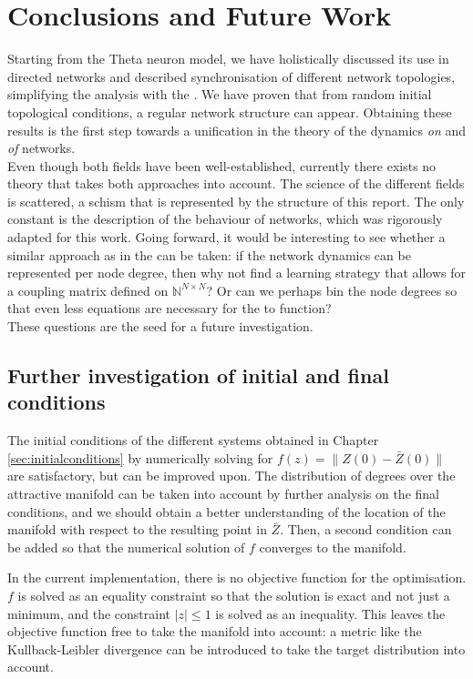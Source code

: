 \newpage
\section{Conclusions and Future Work} \label{sec:ConclusionAndDiscussion}
Starting from the Theta neuron model, we have holistically discussed its use in directed networks and described synchronisation of different network topologies, simplifying the analysis with the \MFR. We have proven that from random initial topological conditions, a regular network structure can appear. Obtaining these results is the first step towards a unification in the theory of the dynamics \textsl{on} and \textsl{of} networks. \\

Even though both fields have been well-established, currently there exists no theory that takes both approaches into account. The science of the different fields is scattered, a schism that is represented by the structure of this report. The only constant is the description of the behaviour of networks, which was rigorously adapted for this work. Going forward, it would be interesting to see whether a similar approach as in the \MFR can be taken: if the network dynamics can be represented per node degree, then why not find a learning strategy that allows for a coupling matrix defined on $\mathbb{N}^{N \times N}$? Or can we perhaps bin the node degrees so that even less equations are necessary for the \MFR to function? \\

These questions are the seed for a future investigation.

\subsection{Further investigation of initial and final conditions}
The initial conditions of the different systems obtained in Chapter \ref{sec:initialconditions} by numerically solving for $f(z) = \| Z(0) - \bar{Z}(0) \|$ are satisfactory, but can be improved upon. The distribution of degrees over the attractive manifold can be taken into account by further analysis on the final conditions, and we should obtain a better understanding of the location of the manifold with respect to the resulting point in $\bar{Z}$. Then, a second condition can be added so that the numerical solution of $f$ converges to the manifold. 

In the current implementation, there is no objective function for the optimisation. $f$ is solved as an equality constraint so that the solution is exact and not just a minimum, and the constraint $| z | \leq 1$ is solved as an inequality. This leaves the objective function free to take the manifold into account: a metric like the Kullback-Leibler divergence can be introduced to take the target distribution into account. 


